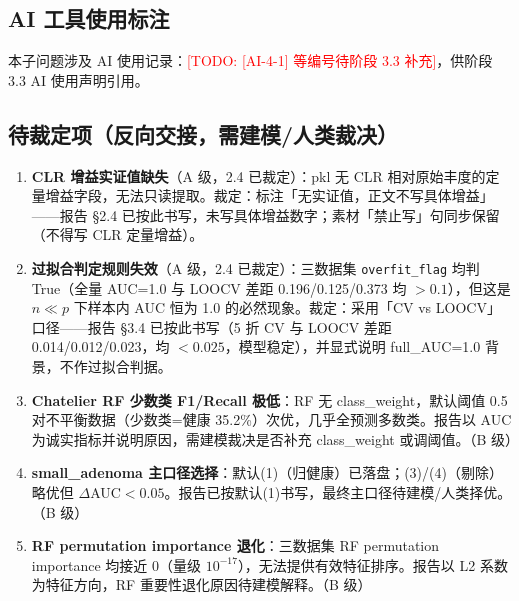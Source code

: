 \documentclass{article}
\newcommand{\todo}[1]{\textcolor{red}{[TODO: #1]}}
\begin{document}
\subsection{AI 工具使用标注}

本子问题涉及 AI 使用记录：\todo{[AI-4-1] 等编号待阶段 3.3 补充}，供阶段 3.3 AI 使用声明引用。

\subsection{待裁定项（反向交接，需建模/人类裁决）}

\begin{enumerate}
  \item \textbf{CLR 增益实证值缺失}（A 级，2.4 已裁定）：pkl 无 CLR 相对原始丰度的定量增益字段，无法只读提取。裁定：标注「无实证值，正文不写具体增益」——报告 §2.4 已按此书写，未写具体增益数字；素材「禁止写」句同步保留（不得写 CLR 定量增益）。
  \item \textbf{过拟合判定规则失效}（A 级，2.4 已裁定）：三数据集 \texttt{overfit\_flag} 均判 True（全量 AUC=1.0 与 LOOCV 差距 0.196/0.125/0.373 均 $>0.1$），但这是 $n\ll p$ 下样本内 AUC 恒为 1.0 的必然现象。裁定：采用「CV vs LOOCV」口径——报告 §3.4 已按此书写（5 折 CV 与 LOOCV 差距 0.014/0.012/0.023，均 $<0.025$，模型稳定），并显式说明 full\_AUC=1.0 背景，不作过拟合判据。
  \item \textbf{Chatelier RF 少数类 F1/Recall 极低}：RF 无 class\_weight，默认阈值 0.5 对不平衡数据（少数类=健康 35.2\%）次优，几乎全预测多数类。报告以 AUC 为诚实指标并说明原因，需建模裁决是否补充 class\_weight 或调阈值。（B 级）
  \item \textbf{small\_adenoma 主口径选择}：默认(1)（归健康）已落盘；(3)/(4)（剔除）略优但 $\Delta$AUC$<0.05$。报告已按默认(1)书写，最终主口径待建模/人类择优。（B 级）
  \item \textbf{RF permutation importance 退化}：三数据集 RF permutation importance 均接近 0（量级 $10^{-17}$），无法提供有效特征排序。报告以 L2 系数为特征方向，RF 重要性退化原因待建模解释。（B 级）
\end{enumerate}
\end{document}
